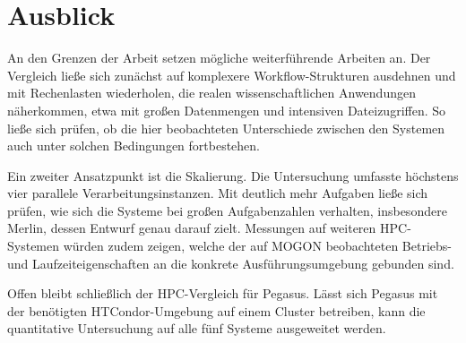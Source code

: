 \section{Ausblick}
\label{sec:conclusion:ausblick}

An den Grenzen der Arbeit setzen mögliche weiterführende
Arbeiten an. Der Vergleich ließe sich zunächst auf komplexere
Workflow-Strukturen ausdehnen und mit Rechenlasten wiederholen, die
realen wissenschaftlichen Anwendungen näherkommen, etwa mit großen
Datenmengen und intensiven Dateizugriffen. So ließe sich prüfen, ob
die hier beobachteten Unterschiede zwischen den Systemen auch unter
solchen Bedingungen fortbestehen.

Ein zweiter Ansatzpunkt ist die Skalierung. Die Untersuchung
umfasste höchstens vier parallele Verarbeitungsinstanzen. Mit
deutlich mehr Aufgaben ließe sich prüfen, wie sich die Systeme bei
großen Aufgabenzahlen verhalten, insbesondere Merlin, dessen Entwurf
genau darauf zielt. Messungen auf weiteren HPC-Systemen würden
zudem zeigen, welche der auf MOGON beobachteten Betriebs- und
Laufzeiteigenschaften an die konkrete Ausführungsumgebung gebunden
sind.

Offen bleibt schließlich der HPC-Vergleich für Pegasus. Lässt sich
Pegasus mit der benötigten HTCondor-Umgebung auf einem Cluster
betreiben, kann die quantitative Untersuchung auf alle fünf Systeme
ausgeweitet werden.